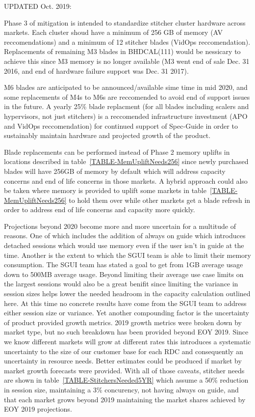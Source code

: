 \documentclass{article}
\begin{document}
UPDATED Oct. 2019:

Phase 3 of mitigation is intended to standardize stitcher cluster hardware across markets. Each cluster shoud have a minimum of 256 GB of memory (AV reccomendations) and a minimum of 12 stitcher blades (VidOps reccomendation). Replacements of remaining M3 blades in BHDCAL(111) would be nessicary to achieve this since M3 memory is no longer available (M3 went end of sale Dec. 31 2016, and end of hardware failure support was Dec. 31 2017). 

M6 blades are anticipated to be announced/available sime time in mid 2020, and some replacements of M4s to M6s are reccomended to avoid end of support issues in the future. A yearly 25\% blade replacment (for all blades including scalers and hypervisors, not just stitchers) is a reccomended infrastructure investment (APO and VidOps reccomendation) for continued support of Spec-Guide in order to sustainably maintain hardware and projected growth of the product. 

Blade replacements can be performed instead of Phase 2 memory uplifts in locations described in table~\ref{TABLE-MemUpliftNeeds256} since newly purchased blades will have 256GB of memory by default which will address capacity concerns and end of life concerns in those markets. A hybrid approach could also be taken where memory is provided to uplift some markets in table~\ref{TABLE-MemUpliftNeeds256} to hold them over while other markets get a blade refresh in order to address end of life concerns and capacity more quickly. 

Projections beyond 2020 become more and more uncertain for a multitude of reasons. One of which includes the addition of always on guide which introduces detached sessions which would use memory even if the user isn't in guide at the time. Another is the extent to which the SGUI team is able to limit their memory consumption. The SGUI team has stated a goal to get from 1GB average usage down to 500MB average usage. Beyond limiting their average use case limits on the largest sessions would also be a great benifit since limiting the variance in session sizes helps lower the needed headroom in the capacity calculation outlined here. At this time no concrete results have come from the SGUI team to address either session size or variance. Yet another compounding factor is the uncertainty of product provided growth metrics. 2019 growth metrics were broken down by market type, but no such breakdown has been provided beyond EOY 2019. Since we know different markets will grow at different rates this introduces a systematic uncertainty to the size of our customer base for each RDC and consequently an uncertainty in resource needs. Better estimates could be produced if market by market growth forecasts were provided. With all of those caveats, stitcher needs are shown in table~\ref{TABLE-StitchersNeeded5YR} which assume a 50\% reduction in session size, maintaining a 3\% concurency, not having always on guide, and that each market grows beyond 2019 maintaining the market shares achieved by EOY 2019 projections. 
\end{document}
